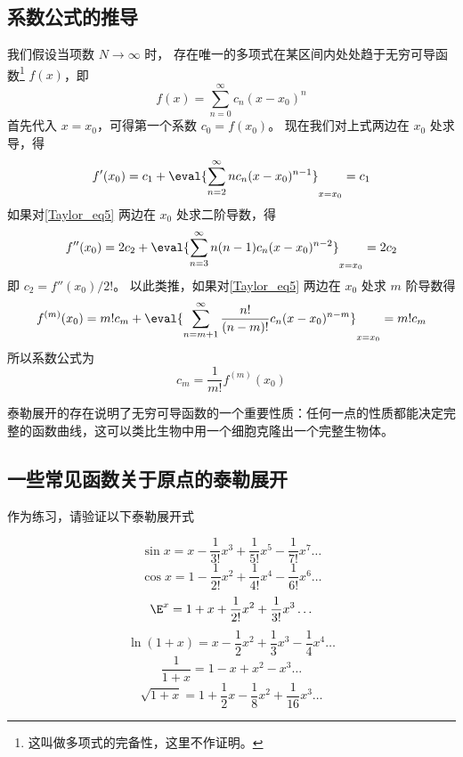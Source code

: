 \subsection{系数公式的推导}
我们假设当项数 $N \to \infty$ 时， 存在唯一的多项式在某区间内处处趋于无穷可导函数\footnote{这叫做多项式的完备性，这里不作证明。} $f(x)$，即
\begin{equation}\label{Taylor_eq5}
f(x) = \sum_{n = 0}^\infty  c_n (x - x_0)^n
\end{equation}
首先代入 $x = x_0$，可得第一个系数 $c_0 = f(x_0)$。 现在我们对上式两边在 $x_0$ 处求导，得
\begin{equation}
f'(x_0) = c_1 + \eval{ \sum_{n = 2}^\infty n c_n (x - x_0)^{n - 1} }_{x = x_0}  = c_1
\end{equation}
如果对\autoref{Taylor_eq5} 两边在 $x_0$ 处求二阶导数，得
\begin{equation}
f''(x_0) = 2 c_2 + \eval{ \sum_{n = 3}^\infty  n(n - 1) c_n (x - x_0)^{n - 2} }_{x = x_0}  = 2 c_2
\end{equation}
即 $c_2 = f''(x_0)/2!$。  以此类推，如果对\autoref{Taylor_eq5} 两边在 $x_0$ 处求 $m$ 阶导数得
\begin{equation}
f^{(m)}(x_0) = m! c_m + \eval{ \sum_{n = m + 1}^\infty  \frac{n!}{(n - m)!} c_n (x - x_0)^{n - m} }_{x = x_0}  = m! c_m
\end{equation}
所以系数公式为
\begin{equation}
{c_m} = \frac{1}{m!} f^{(m)}(x_0)
\end{equation}

泰勒展开的存在说明了无穷可导函数的一个重要性质：任何一点的性质都能决定完整的函数曲线，这可以类比生物中用一个细胞克隆出一个完整生物体。

\subsection{一些常见函数关于原点的泰勒展开}
作为练习，请验证以下泰勒展开式

\begin{equation}
\sin x = x - \frac{1}{3!} x^3 + \frac{1}{5!} x^5 - \frac{1}{7!} x^7 \ldots
\end{equation}
\begin{equation}
\cos x = 1 - \frac{1}{2!} x^2 + \frac{1}{4!} x^4 -\frac{1}{6!} x^6 \ldots
\end{equation}
\begin{equation}\label{Taylor_eq11}
\E^x =1 + x + \frac{1}{2!} x^2 + \frac{1}{3!} x^3  \ldots
\end{equation}
\begin{equation}
\ln (1+x) = x - \frac12 x^2 + \frac13 x^3 - \frac14 x^4 \ldots
\end{equation}
\begin{equation}
\frac{1}{1+x} = 1 - x + x^2 - x^3 \ldots
\end{equation}
\begin{equation}
\sqrt{1+x} = 1 + \frac12 x - \frac18 x^2 + \frac{1}{16} x^3 \ldots
\end{equation}

